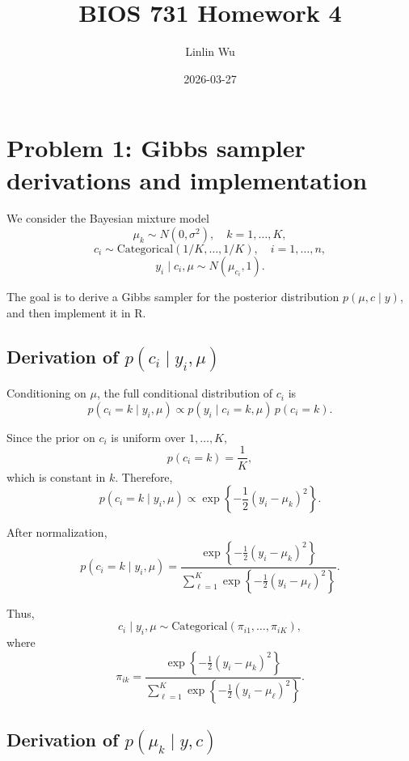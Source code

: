 \documentclass[
]{article}
\title{BIOS 731 Homework 4}
\author{Linlin Wu}
\date{2026-03-27}
\begin{document}
\maketitle

\section{Problem 1: Gibbs sampler derivations and
implementation}\label{problem-1-gibbs-sampler-derivations-and-implementation}

We consider the Bayesian mixture model \[
\mu_k \sim N(0,\sigma^2), \quad k = 1,\dots,K,
\] \[
c_i \sim \text{Categorical}(1/K,\dots,1/K), \quad i = 1,\dots,n,
\] \[
y_i \mid c_i,\mu \sim N(\mu_{c_i}, 1).
\]

The goal is to derive a Gibbs sampler for the posterior distribution
\(p(\mu, c \mid y)\), and then implement it in R.

\subsection{\texorpdfstring{Derivation of
\(p(c_i \mid y_i, \mu)\)}{Derivation of p(c\_i \textbackslash mid y\_i, \textbackslash mu)}}\label{derivation-of-pc_i-mid-y_i-mu}

Conditioning on \(\mu\), the full conditional distribution of \(c_i\) is
\[
p(c_i = k \mid y_i, \mu)
\propto p(y_i \mid c_i = k, \mu)\, p(c_i = k).
\]

Since the prior on \(c_i\) is uniform over \(1,\dots,K\), \[
p(c_i = k) = \frac{1}{K},
\] which is constant in \(k\). Therefore, \[
p(c_i = k \mid y_i, \mu)
\propto \exp\left\{-\frac12 (y_i - \mu_k)^2\right\}.
\]

After normalization, \[
p(c_i = k \mid y_i, \mu)
=
\frac{\exp\left\{-\frac12 (y_i - \mu_k)^2\right\}}
{\sum_{\ell=1}^K \exp\left\{-\frac12 (y_i - \mu_\ell)^2\right\}}.
\]

Thus, \[
c_i \mid y_i, \mu \sim \text{Categorical}(\pi_{i1},\dots,\pi_{iK}),
\] where \[
\pi_{ik}
=
\frac{\exp\left\{-\frac12 (y_i - \mu_k)^2\right\}}
{\sum_{\ell=1}^K \exp\left\{-\frac12 (y_i - \mu_\ell)^2\right\}}.
\]

\subsection{\texorpdfstring{Derivation of
\(p(\mu_k \mid y, c)\)}{Derivation of p(\textbackslash mu\_k \textbackslash mid y, c)}}\label{derivation-of-pmu_k-mid-y-c}
\end{document}
